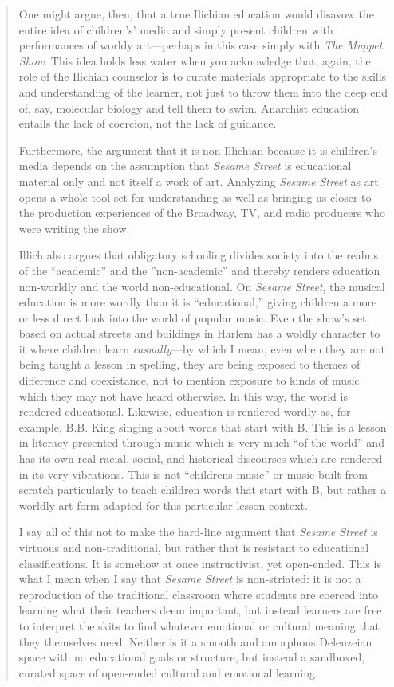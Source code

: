 \documentclass[12pt,letterpaper]{article}
\newcommand{\ses}{\textit{Sesame Street }}
\begin{document}
\begin{quote}
	One might argue, then, that a true Ilichian education would disavow the
	entire idea of children's' media and simply present children with 
	performances of worldy art---perhaps in this case simply with 
	\textit{The Muppet Show}. This idea holds less water when you 
	acknowledge that, again, the role of the Ilichian counselor is to curate
	materials appropriate to the skills and understanding of the learner, 
	not just to throw them into the deep end of, say, molecular biology 
	and tell them to swim. Anarchist education entails the lack of coercion,
	not the lack of guidance. 

	Furthermore, the argument that it is non-Illichian because it is
	children's media depends on the assumption that \ses is educational
	material only and not itself a work of art. 
	Analyzing \ses as art opens a whole tool set for understanding as well
	as bringing us closer to the production experiences of the Broadway, TV,
	and radio producers who were writing the show.  

	Illich also argues that obligatory schooling divides society into the 
	realms of the ``academic'' and the ''non-academic'' and thereby renders
	education non-worldly and the world non-educational.\autocite[12]
	{Illich} On \textit{Sesame Street}, the musical education is more wordly
	than it is ``educational,'' giving children a more or less direct look 
	into the world of popular music. Even the show's set, based on actual
	streets and buildings in Harlem\autocite[154]{Davis} has a
	 woldly character to it where children learn \textit{casually}---by 
	which I mean, even when they are not being taught a lesson in spelling,
	they are being exposed to themes of difference and coexistance, not to 
	mention exposure to kinds of music which they may not have heard 
	otherwise. In this way, the world is rendered educational. Likewise, 
	education is rendered wordly as, for example, B.B. King singing about 
	words that start with B. This is a lesson in literacy presented through
	music which is very much ``of the world'' and has its own real racial, 
	social, and historical discourses which are rendered in its very 
	vibrations. This is not ``childrens music'' or music built from scratch
	particularly to teach children words that start with B, but rather a 
	worldly art form adapted for this particular lesson-context.

	I say all of this not to make the hard-line argument that \textit{Sesame
	Street} is virtuous and non-traditional, but rather that is  
	resistant to educational classifications.
	It is somehow at once instructivist, yet open-ended. This
	is what I mean when I say that \textit{Sesame Street} is non-striated: 
	it is not a reproduction of the traditional classroom where students are
	coerced into learning what their teachers deem important, but instead 
	learners are free to interpret the skits to find whatever emotional or 
	cultural meaning that they themselves need. Neither is it a smooth 
	and amorphous Deleuzeian space with no educational goals or structure, 
	but 
	instead a sandboxed, curated space of open-ended cultural and 
	emotional learning.


\end{quote}
\end{document}
